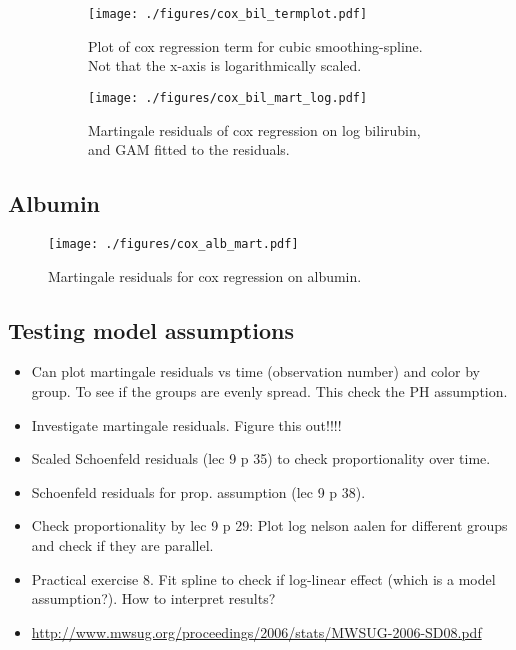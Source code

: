 \documentclass[11pt,a4paper]{article}
\begin{document}
\begin{figure}[h!tbp]
    \centering
    \begin{subfigure}[b]{0.48\textwidth}
        \texttt{[image: ./figures/cox\_bil\_termplot.pdf]}
        \caption{Plot of cox regression term for cubic smoothing-spline. Not that the x-axis is logarithmically scaled.}
        \label{fig:cox_bil_termplot}
    \end{subfigure}%
    \quad
    \begin{subfigure}[b]{0.48\textwidth}
        \texttt{[image: ./figures/cox\_bil\_mart\_log.pdf]}
        \caption{Martingale residuals of cox regression on log bilirubin, and GAM fitted to the residuals.}
        \label{fig:cox_bil_mart_log}
    \end{subfigure}
    \vspace{1\baselineskip}
    \caption{}
    \label{fig:cox_bil_term_and_mart}
\end{figure}



\subsection{Albumin}


\begin{figure}[h!tb]
    \begin{center}
        \texttt{[image: ./figures/cox\_alb\_mart.pdf]}
    \end{center}
    \vspace{-0.2cm}
    \caption{Martingale residuals for cox regression on albumin.}
    \label{fig:cox_alb_mart}
\end{figure}


\subsection{Testing model assumptions}

\begin{itemize}
    \item Can plot martingale residuals vs time (observation number) and color by group. To see if the groups are evenly spread. This check the PH assumption.
    \item Investigate martingale residuals. Figure this out!!!!
    \item Scaled Schoenfeld residuals (lec 9 p 35) to check proportionality over time.
    \item Schoenfeld residuals for prop. assumption (lec 9 p 38).
    \item Check proportionality by lec 9 p 29: Plot log nelson aalen for different groups and check if they are parallel.
    \item Practical exercise 8. Fit spline to check if log-linear effect (which is a model assumption?). How to interpret results?
    \item \url{http://www.mwsug.org/proceedings/2006/stats/MWSUG-2006-SD08.pdf}
\end{itemize}
\end{document}
